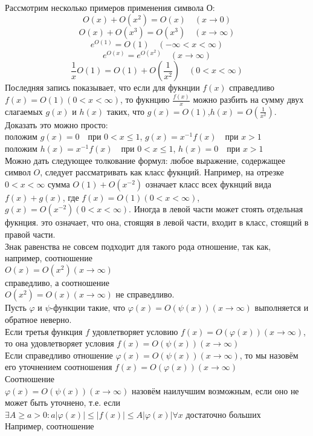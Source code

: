 \documentclass{report}
\begin{document}
Рассмотрим несколько примеров применения символа О:
\[O(x)+O(x^{2})=O(x)\quad(x\to0)\]
\[O(x)+O(x^{3})=O(x^{3})\quad(x\to\infty)\]
\[e^{O(1)}=O(1)\quad(-\infty<x<\infty)\]
\[e^{O(x)}=e^{O(x^{2})}\quad(x\to\infty)\]
\[\frac{1}{x}O(1)=O(1)+O(\frac{1}{x^{2}})\quad(0<x<\infty)\]
Последняя запись показывает, что если для фукнции $f(x)$ справедливо $f(x)=O(1)(0<x<\infty)$, то фукнцию $\frac{f(x)}{x}$ можно разбить на сумму двух слагаемых $g(x)$ и $h(x)$ таких,
что $g(x)=O(1)$,$h(x)=O(\frac{1}{x^{2}})$. \\ 
Доказать это можно просто: \\
положим $g(x)=0\quad\textrm{при }0<x\le1$, $g(x)=x^{-1}f(x)\quad\textrm{при }x>1$ \\
положим $h(x)=x^{-1}f(x)\quad\textrm{при }0<x\le1$, $h(x)=0\quad\textrm{при }x>1$ \\
Можно дать следующее толкование формул: любое выражение, содержащее символ $O$, следует рассматривать как класс фукнций. Например, на отрезке $0<x<\infty$ сумма $O(1)+O(x^{-2})$
означает класс всех фукнций вида $f(x)+g(x)$, где $f(x)=O(1) (0<x<\infty)$, $g(x)=O(x^{-2}) (0<x<\infty)$. Иногда в левой части может стоять отдельная фукнция. это означает, что она,
стоящяя в левой части, входит в класс, стоящий в правой части. \\
Знак равенства не совсем подходит для такого рода отношение, так как, например, соотношение \\
 $O(x)=O(x^{2})(x\to\infty)$ \\
справедливо, а соотношение \\ 
$O(x^{2})=O(x)(x\to\infty)$ не справедливо. \\
Пусть $\varphi$ и $\psi$-функции такие, что $\varphi(x)=O(\psi(x))(x\to\infty)$ выполняется и обратное неверно. \\
Если третья функция $f$ удовлетворяет условию $f(x)=O(\varphi(x))(x\to\infty)$, то она удовлетворяет условия $f(x)=O(\psi(x))(x\to\infty)$ \\
Если справедливо отношение $\varphi(x)=O(\psi(x))(x\to\infty)$, то мы назовём его уточнением соотношения $f(x)=O(\varphi(x))(x\to\infty)$ \\
Соотношение 
\\ $\varphi(x)=O(\psi(x))(x\to\infty)$ назовём наилучшим возможным, если оно не может быть уточнено, т.е. если \\ 
$\exists A\geq a>0: a|\varphi(x)|\le|f(x)|\le A|\varphi(x)| \forall x$ достаточно больших \\
Например, соотношение \\ 
\end{document}
